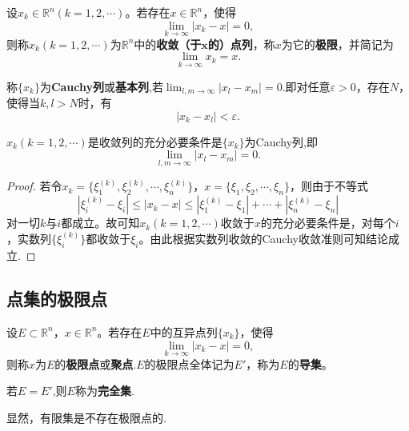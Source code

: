 \documentclass[../../main.tex]{subfiles}
\begin{document}
\begin{definition}
  设\(x_k\in\mathbb{R}^n(k = 1,2,\cdots)\)。若存在\(x\in\mathbb{R}^n\)，使得
\[\lim_{k\rightarrow\infty}|x_k - x| = 0,\]
则称\(x_k(k = 1,2,\cdots)\)为\(\mathbb{R}^n\)中的\textbf{收敛（于\(\boldsymbol{x}\)的）点列}，称\(x\)为它的\textbf{极限}，并简记为
\[\lim_{k\rightarrow\infty}x_k = x.\]
\end{definition}

\begin{definition}[Cauchy列]\label{definition:Cauchy列}
  称\(\{x_k\}\)为\textbf{Cauchy列}或\textbf{基本列},若$\lim_{l,m\rightarrow\infty}|x_l - x_m| = 0$.即对任意\(\varepsilon>0\)，存在\(N\)，使得当\(k,l>N\)时，有
\[|x_k - x_l|<\varepsilon.\]
\end{definition}

\begin{theorem}
  \(x_k(k = 1,2,\cdots)\)是收敛列的充分必要条件是\(\{x_k\}\)为Cauchy列,即
\[\lim_{l,m\rightarrow\infty}|x_l - x_m| = 0.\]
\end{theorem}
\begin{proof}
  若令\(x_k=\{\xi_1^{(k)},\xi_2^{(k)},\cdots,\xi_n^{(k)}\}\)，\(x = \{\xi_1,\xi_2,\cdots,\xi_n\}\)，则由于不等式
\[|\xi_i^{(k)} - \xi_i|\leqslant|x_k - x|\leqslant|\xi_1^{(k)} - \xi_1|+\cdots+|\xi_n^{(k)} - \xi_n|\]
对一切\(k\)与\(i\)都成立。故可知\(x_k(k = 1,2,\cdots)\)收敛于\(x\)的充分必要条件是，对每个\(i\)，实数列\(\{\xi_i^{(k)}\}\)都收敛于\(\xi_i\)。由此根据实数列收敛的Cauchy收敛准则可知结论成立.
\end{proof}

\subsection{点集的极限点}

\begin{definition}\label{definition:极限点、导集与完全集}
设\(E\subset\mathbb{R}^n\)，\(x\in\mathbb{R}^n\)。若存在\(E\)中的互异点列\(\{x_k\}\)，使得
\[\lim_{k\rightarrow\infty}|x_k - x| = 0,\]
则称\(x\)为\(E\)的\textbf{极限点}或\textbf{聚点}.\(E\)的极限点全体记为\(E'\)，称为\(E\)的\textbf{导集}。

若$E = E'$,则$E$称为\textbf{完全集}.
\end{definition}
\begin{note}
显然，有限集是不存在极限点的.
\end{note}
\end{document}
